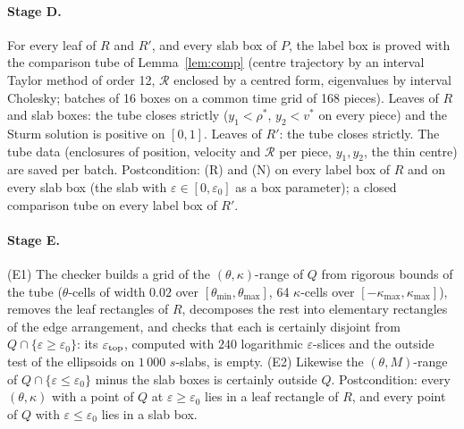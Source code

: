 \paragraph{Stage D.} For every leaf of $R$ and $R'$, and every slab box of $P$, the label box is proved with the
comparison tube of Lemma~\ref{lem:comp} (centre trajectory by an interval Taylor method of order 12, $\mathcal R$
enclosed by a centred form, eigenvalues by interval Cholesky; batches of 16 boxes on a common time grid of 168
pieces). Leaves of $R$ and slab boxes: the tube closes strictly ($y_1<\rho^*$, $y_2<v^*$ on every piece) and the Sturm
solution is positive on $[0,1]$. Leaves of $R'$: the tube closes strictly. The tube data (enclosures of position,
velocity and $\mathcal R$ per piece, $y_1,y_2$, the thin centre) are saved per batch. Postcondition: (R) and (N) on
every label box of $R$ and on every slab box (the slab with $\varepsilon\in[0,\varepsilon_0]$ as a box parameter);
a closed comparison tube on every label box of $R'$.

\paragraph{Stage E.} (E1) The checker builds a grid of the $(\theta,\kappa)$-range of $Q$ from rigorous bounds of the tube
($\theta$-cells of width $0.02$ over $[\theta_{\min},\theta_{\max}]$, 64 $\kappa$-cells over $[-\kappa_{\max},\kappa_{\max}]$),
removes the leaf rectangles of $R$, decomposes the rest into elementary rectangles of the edge arrangement, and checks
that each is certainly disjoint from $Q\cap\{\varepsilon\ge\varepsilon_0\}$: its $\varepsilon_{\rm top}$, computed
with $240$ logarithmic $\varepsilon$-slices and the outside test of the ellipsoids on $1\,000$ $s$-slabs, is empty.
(E2) Likewise the $(\theta,M)$-range of $Q\cap\{\varepsilon\le\varepsilon_0\}$ minus the slab boxes is certainly outside
$Q$. Postcondition: every $(\theta,\kappa)$ with a point of $Q$ at $\varepsilon\ge\varepsilon_0$ lies in a leaf rectangle of
$R$, and every point of $Q$ with $\varepsilon\le\varepsilon_0$ lies in a slab box.


